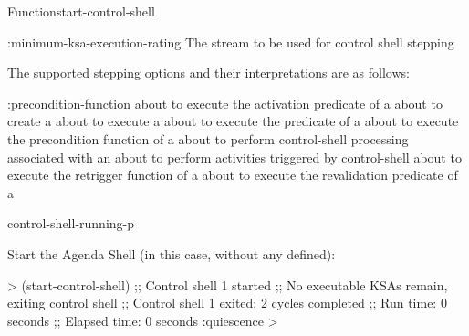 \documentclass[10pt,twoside,english,pdftex]{article}
\begin{document}
\begin{functiondoc}{Function}{start-control-shell}
\begin{keywords}{:minimum-ksa-execution-rating}
   The stream to be used for control shell stepping

\end{keywords}


%
%
%
The supported stepping options and their interpretations are as follows:
\begin{keywords}{:precondition-function}
 about to execute the activation
predicate of a 
\keyword[:ks-activation] about to create a 
 about to execute a 
 about to execute the 
predicate of a 
 about to execute the precondition
function of a  
 about to perform control-shell processing
associated with an 
\keyword[:quiescence] about to perform activities triggered by 
control-shell  
 about to execute the retrigger
function of a  
 about to execute the revalidation predicate
of a  
\end{keywords}

\begin{alsos}{control-shell-running-p}
\end{alsos}

\fnexamples
Start the Agenda Shell (in this case, without any  defined):
%
\W\supp
\begin{example}
  > (start-control-shell)
  ;; Control shell 1 started
  ;; No executable KSAs remain, exiting control shell
  ;; Control shell 1 exited: 2 cycles completed
  ;; Run time: 0 seconds
  ;; Elapsed time: 0 seconds
  :quiescence
  >
\end{example}


\end{functiondoc}
\end{document}
